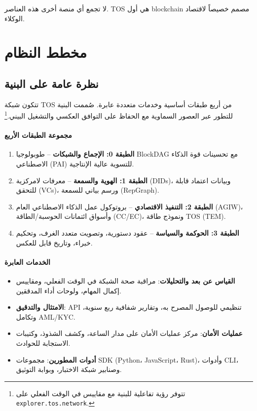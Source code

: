 \documentclass[11pt]{article}
\begin{document}
لا تجمع أي منصة أخرى هذه العناصر. TOS هي أول blockchain مصمم خصيصاً لاقتصاد الوكلاء.

\section{مخطط النظام}
\subsection{نظرة عامة على البنية}
تتكون شبكة TOS من أربع طبقات أساسية وخدمات متعددة عابرة. صُممت البنية للتطور عبر العصور السماوية مع الحفاظ على التوافق العكسي والتشغيل البيني.\footnote{تتوفر رؤية تفاعلية للبنية مع مقاييس في الوقت الفعلي على \texttt{explorer.tos.network}.}

\paragraph{مجموعة الطبقات الأربع}
\begin{enumerate}[noitemsep]
  \item \textbf{الطبقة 0: الإجماع والشبكات} -- طوبولوجيا BlockDAG مع تحسينات قوة الذكاء الاصطناعي (PAI) للتسوية عالية الإنتاجية.
  \item \textbf{الطبقة 1: الهوية والسمعة} -- معرفات لامركزية (DIDs)، وبيانات اعتماد قابلة للتحقق (VCs)، ورسم بياني للسمعة (RepGraph).
  \item \textbf{الطبقة 2: التنفيذ الاقتصادي} -- بروتوكول عمل الذكاء الاصطناعي العام (AGIW)، وأسواق ائتمانات الحوسبة/الطاقة (CC/EC)، ونموذج طاقة TOS (TEM).
  \item \textbf{الطبقة 3: الحوكمة والسياسة} -- عقود دستورية، وتصويت متعدد الغرف، وتحكيم خبراء، وتاريخ قابل للعكس.
\end{enumerate}

\paragraph{الخدمات العابرة}
\begin{itemize}[noitemsep]
  \item \textbf{القياس عن بعد والتحليلات}: مراقبة صحة الشبكة في الوقت الفعلي، ومقاييس إكمال المهام، ولوحات أداء المدققين.
  \item \textbf{الامتثال والتدقيق}: API تنظيمي للوصول المصرح به، وتقارير شفافية ربع سنوية، وتكامل AML/KYC.
  \item \textbf{عمليات الأمان}: مركز عمليات الأمان على مدار الساعة، وكشف الشذوذ، وكتيبات الاستجابة للحوادث.
  \item \textbf{أدوات المطورين}: مجموعات SDK (Python، JavaScript، Rust)، وأدوات CLI، وصنابير شبكة الاختبار، وبوابة التوثيق.
\end{itemize}
\end{document}
